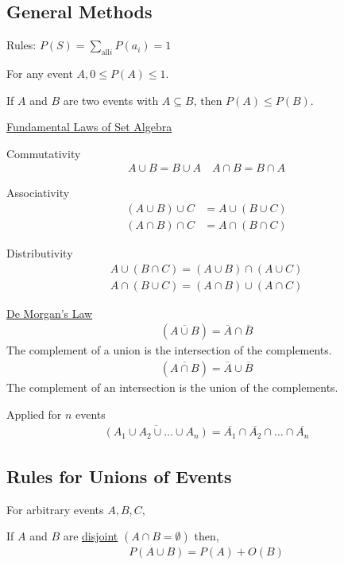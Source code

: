 \documentclass{article}
\begin{document}
\subsection{General Methods}

Rules:
$P(S) = \sum_{\text{all} i} P(a_i) = 1$

For any event $A, 0 \le P(A) \le 1$. 

If $A$ and $B$ are two events with $A \subseteq B$, then $P(A) \le P(B)$.

\underline{Fundamental Laws of Set Algebra}

Commutativity
\begin{align*}
    A \cup B = B \cup A \quad A \cap B = B \cap A
\end{align*}

Associativity
\begin{align*}
    (A \cup B) \cup C &= A \cup (B \cup C) \\
    (A \cap B) \cap C &= A \cap (B \cap C)
\end{align*}

Distributivity
\begin{align*}
    A \cup (B \cap C) = (A \cup B) \cap (A \cup C)\\
    A \cap (B \cup C) = (A \cap B) \cup (A \cap C)
\end{align*}

\underline{De Morgan's Law}
\begin{align*}
    (\overline{A \cup B}) = \overline{A} \cap \overline{B}
\end{align*}
The complement of a union is the intersection of the complements. 
\begin{align*}
    (\overline{A \cap B}) = \overline{A} \cup \overline{B}
\end{align*}
The complement of an intersection is the union of the complements.

Applied for $n$ events
\begin{align*}
    \overline{(A_1 \cup A_2 \cup \ldots \cup A_n)} = \overline{A_1} \cap \overline{A_2} \cap \ldots \cap \overline{A_n}
\end{align*}


\subsection{Rules for Unions of Events}

For arbitrary events $A,B, C$, 

If $A$ and $B$ are \underline{disjoint} $(A \cap B = \emptyset)$ then,
\begin{align*}
    P(A \cup B) = P(A) + O(B)
\end{align*}
\end{document}
